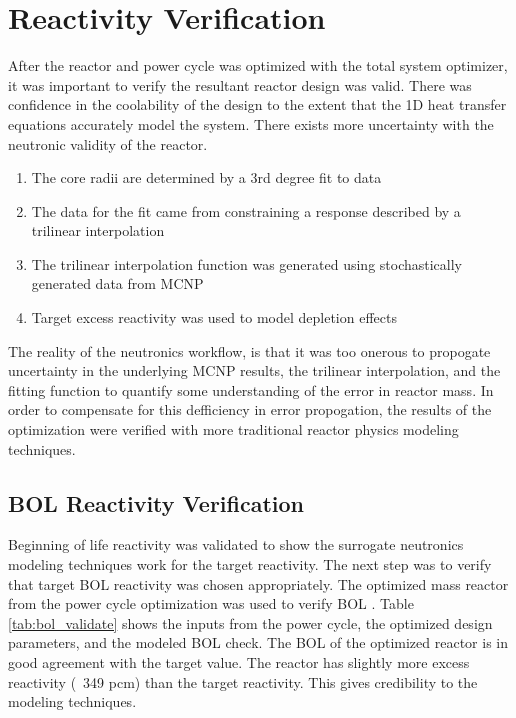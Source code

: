 \section{Reactivity Verification}
After the reactor and power cycle was optimized with the total system optimizer,
it was important to verify the resultant reactor design was valid. There was
confidence in the coolability of the design to the extent that the 1D heat
transfer equations accurately model the system. There exists more uncertainty
with the neutronic validity of the reactor.

\onehalfspacing
\begin{enumerate}
    \item The core radii are determined by a 3rd degree fit to data
    \item The data for the fit came from constraining a \keff response described
        by a trilinear interpolation
    \item The trilinear interpolation function was generated using stochastically
        generated \keff data from MCNP
    \item Target excess reactivity was used to model depletion effects
\end{enumerate}
\doublespacing

The reality of the neutronics workflow, is that it was too onerous to propogate
uncertainty in the underlying MCNP results, the trilinear interpolation, and the
fitting function to quantify some understanding of the error in reactor mass. In
order to compensate for this defficiency in error propogation, the results of
the optimization were verified with more traditional reactor physics modeling
techniques.

\subsection{BOL Reactivity Verification}
Beginning of life reactivity was validated to show the surrogate neutronics
modeling techniques work for the target reactivity. The next step was to verify
that target BOL reactivity was chosen appropriately. The optimized mass reactor
from the power cycle optimization was used to verify BOL \keff. Table
\ref{tab:bol_validate} shows the inputs from the power cycle, the optimized
design parameters, and the modeled BOL \keff check. The BOL \keff of the optimized reactor
is in good agreement with the target value. 
The reactor has slightly more excess reactivity (~349 pcm) than the
target reactivity. This gives credibility to the \keff modeling techniques.

